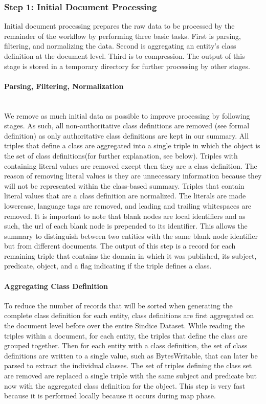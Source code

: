\documentclass[11pt,onecolumn]{article}
\begin{document}
\subsubsection{Step 1: Initial Document Processing}
Initial document processing prepares the raw data to be processed by the remainder of the workflow by performing three basic tasks. First is parsing, filtering, and normalizing the data.  Second is aggregating an entity's class definition at the document level.  Third is to compression.  The output of this stage is stored in a temporary directory for further processing by other stages.

\paragraph{Parsing, Filtering, Normalization}
\\
We remove as much initial data as possible to improve processing by following stages. As such, all non-authoritative class definitions are removed (see formal definition) as only authoritative class definitions are kept in our summary. All triples that define a class are aggregated into a single triple in which the object is the set of class definitions(for further explanation, see below).  Triples with containing literal values are removed except then they are a class definition.  The reason of removing literal values is they are unnecessary information because they will not be represented within the class-based summary. Triples that contain literal values that are a class definition are normalized. The literals are made lowercase, language tags are removed, and leading and trailing whitespaces are removed.  It is important to note that blank nodes are local identifiers and as such, the url of each blank node is prepended to its identifier.  This allows the summary to distinguish between two entities with the same blank node identifier but from different documents.  The output of this step is a record for each remaining triple that contains the domain in which it was published, its subject, predicate, object, and a flag indicating if the triple defines a class.


\paragraph{Aggregating Class Definition}
To reduce the number of records that will be sorted when generating the complete class definition for each entity, class definitions are first aggregated on the document level before over the entire Sindice Dataset.  While reading the triples within a document, for each entity, the triples that define the class are grouped together.  Then for each entity with a class definition, the set of class definitions are written to a single value, such as BytesWritable, that can later be parsed to extract the individual classes.  The set of triples defining the class set are removed are replaced a single triple with the same subject and predicate but now with the aggregated class definition for the object.  This step is very fast because it is performed locally because it occurs during map phase.  
\end{document}
